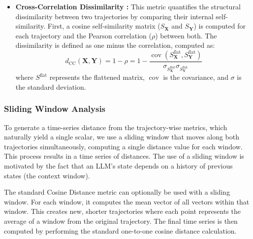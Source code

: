 \documentclass[a4paper,12pt]{article}
\begin{document}
\begin{itemize}
        \item \textbf{Cross-Correlation Dissimilarity \cite{pearson} \cite{scipy_pearson}:} This metric quantifies the structural dissimilarity between two trajectories by comparing their internal self-similarity. First, a cosine self-similarity matrix ($S_{\mathbf{X}}$ and $S_{\mathbf{Y}}$) is computed for each trajectory and the Pearson correlation ($\rho$) between both. The dissimilarity is defined as one minus the correlation, computed as:
        \begin{equation}
            d_{\text{CC}}(\mathbf{X}, \mathbf{Y}) = 1 - \rho = 1 - \frac{\operatorname{cov}(S_{\mathbf{X}}^\text{flat}, S_{\mathbf{Y}}^\text{flat})}{\sigma_{S_{\mathbf{X}}^\text{flat}} \sigma_{S_{\mathbf{Y}}^\text{flat}}}
        \end{equation}
        where $S^\text{flat}$ represents the flattened matrix, $\operatorname{cov}$ is the covariance, and $\sigma$ is the standard deviation.

    \end{itemize}

    \subsubsection{Sliding Window Analysis}
    \label{sssec:methods_sliding_window}
    To generate a time-series distance from the trajectory-wise metrics, which naturally yield a single scalar, we use a sliding window that moves along both trajectories simultaneously, computing a single distance value for each window. This process results in a time series of distances. The use of a sliding window is motivated by the fact that an LLM's state depends on a history of previous states (the context window).

    The standard Cosine Distance metric can optionally be used with a sliding window. For each window, it computes the mean vector of all vectors within that window. This creates new, shorter trajectories where each point represents the average of a window from the original trajectory. The final time series is then computed by performing the standard one-to-one cosine distance calculation.



\end{document}
